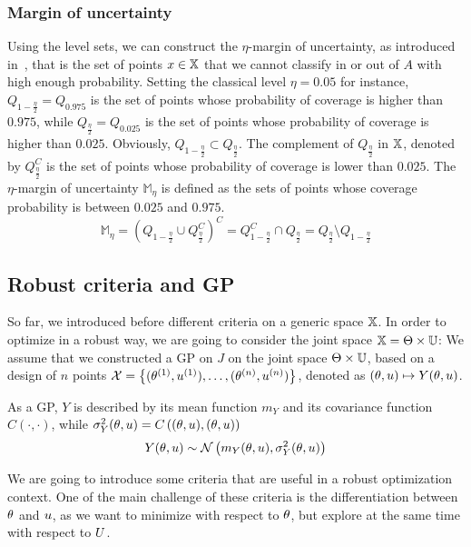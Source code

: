 \documentclass[../../Main_ManuscritThese.tex]{subfiles}
\begin{document}
\subsubsection{Margin of uncertainty}
\label{sec:margin_of_uncertainty}
Using the level sets, we can construct the $\eta$-margin of uncertainty, as introduced in~\cite{dubourg_reliability-based_2011}, that is the set of points $x \in \mathbb{X}$ that we cannot classify in or out of $A$ with high enough probability.
Setting the classical level $\eta=0.05$ for instance, $Q_{1-\frac{\eta}{2}}=Q_{0.975}$ is the set of points whose probability of coverage is higher than $0.975$, while $Q_{\frac{\eta}{2}}=Q_{0.025}$ is the set of points whose probability of coverage is higher than $0.025$. Obviously, $Q_{1-\frac{\eta}{2}} \subset Q_{\frac{\eta}{2}}$. The complement of $Q_{\frac{\eta}{2}}$ in $\mathbb{X}$, denoted by $Q_{\frac{\eta}{2}}^C$ is the set of points whose probability of coverage is lower than $0.025$. The $\eta$-margin of uncertainty $\mathbb{M}_{\eta}$ is defined as the sets of points whose coverage probability is between $0.025$ and $0.975$.
\begin{equation}
  \label{eq:margin_unc}
  \mathbb{M}_{\eta} = \left(Q_{1-\frac{\eta}{2}} \cup Q^C_{\frac{\eta}{2}} \right)^C = Q_{1-\frac{\eta}{2}}^C \cap Q_{\frac{\eta}{2}} = Q_{\frac{\eta}{2}} \setminus Q_{1-\frac{\eta}{2}}
\end{equation}


\subsection{Robust criteria and GP}
So far, we introduced before different criteria on a generic space $\mathbb{X}$. In order to optimize in a robust way, we are going to consider the joint space $\mathbb{X} = \Theta \times \mathbb{U}$:
We assume that we constructed a GP on $J$ on the joint space $\Theta \times \mathbb{U}$, based on a design of $n$ points $\mathcal{X} = \left\{(\theta^{(1)},u^{(1)}),\dots,(\theta^{(n)},u^{(n)}) \right\}$, denoted as $(\theta,u)\mapsto Y(\theta,u)$.

As a GP, $Y$ is described by its mean function $m_{Y}$ and its covariance function $C(\cdot, \cdot)$, while $\sigma^2_Y(\theta,u) = C\left((\theta,u), (\theta,u)\right)$
\begin{equation}
  Y(\theta,u) \sim \mathcal{N}\left(m_{Y}(\theta,u), \sigma^2_Y(\theta,u) \right)
\end{equation}

We are going to introduce some criteria that are useful in a robust optimization context. One of the main challenge of these criteria is the differentiation between $\theta$ and $u$, as we want to minimize with respect to $\theta$, but explore at the same time with respect to $U$.
\end{document}
